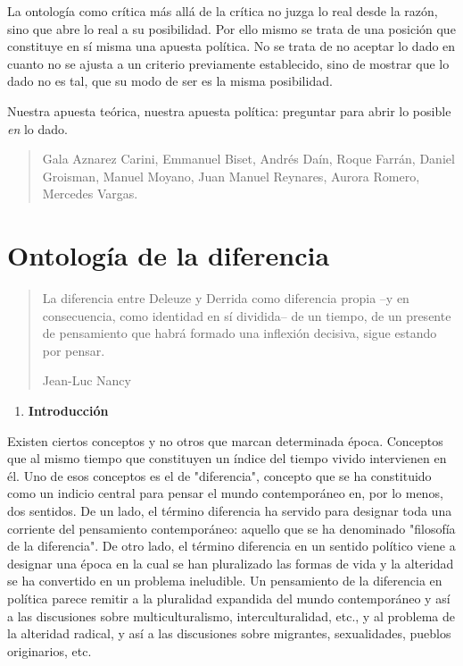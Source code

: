 \documentclass{book}
\begin{document}
La ontología como crítica más allá de la crítica no juzga lo real desde
la razón, sino que abre lo real a su posibilidad. Por ello mismo se
trata de una posición que constituye en sí misma una apuesta política.
No se trata de no aceptar lo dado en cuanto no se ajusta a un criterio
previamente establecido, sino de mostrar que lo dado no es tal, que su
modo de ser es la misma posibilidad.

Nuestra apuesta teórica, nuestra apuesta política: preguntar para abrir
lo posible \emph{en} lo dado.

\begin{quote}
Gala Aznarez Carini, Emmanuel Biset, Andrés Daín, Roque Farrán, Daniel
Groisman, Manuel Moyano, Juan Manuel Reynares, Aurora Romero, Mercedes
Vargas.
\end{quote}

\chapter*{Ontología de la diferencia}


\begin{quote}
La diferencia entre Deleuze y Derrida como diferencia propia --y en
consecuencia, como identidad en sí dividida-- de un tiempo, de un
presente de pensamiento que habrá formado una inflexión decisiva, sigue
estando por pensar.

Jean-Luc Nancy
\end{quote}

\begin{enumerate}
\def\labelenumi{\arabic{enumi}.}
\item
  \textbf{Introducción}
\end{enumerate}

Existen ciertos conceptos y no otros que marcan determinada época.
Conceptos que al mismo tiempo que constituyen un índice del tiempo
vivido intervienen en él. Uno de esos conceptos es el de "diferencia",
concepto que se ha constituido como un indicio central para pensar el
mundo contemporáneo en, por lo menos, dos sentidos. De un lado, el
término diferencia ha servido para designar toda una corriente del
pensamiento contemporáneo: aquello que se ha denominado "filosofía de la
diferencia". De otro lado, el término diferencia en un sentido político
viene a designar una época en la cual se han pluralizado las formas de
vida y la alteridad se ha convertido en un problema ineludible. Un
pensamiento de la diferencia en política parece remitir a la pluralidad
expandida del mundo contemporáneo y así a las discusiones sobre
multiculturalismo, interculturalidad, etc., y al problema de la
alteridad radical, y así a las discusiones sobre migrantes,
sexualidades, pueblos originarios, etc.
\end{document}
